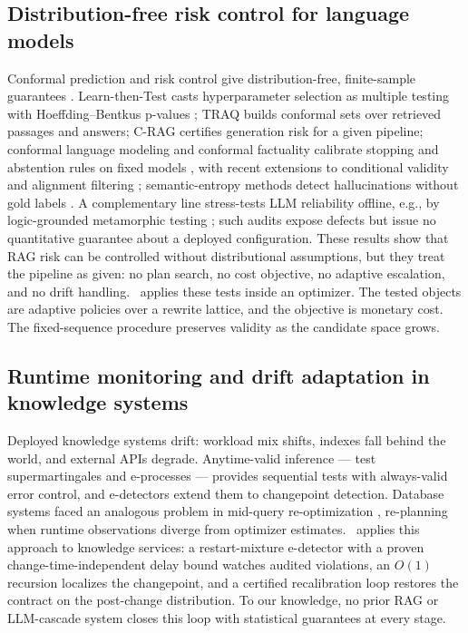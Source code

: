 \subsection{Distribution-free risk control for language models}
Conformal prediction and risk control give distribution-free,
finite-sample guarantees
\citep{vovk2005algorithmic,angelopoulos2024crc}.
Learn-then-Test \citep{angelopoulos2021ltt} casts hyperparameter
selection as multiple testing with Hoeffding--Bentkus p-values
\citep{bentkus2004hoeffding}; TRAQ \citep{li2024traq} builds conformal
sets over retrieved passages and answers; C-RAG \citep{kang2024crag}
certifies generation risk for a given pipeline; conformal language
modeling and conformal factuality calibrate stopping and abstention
rules on fixed models
\citep{quach2024conformallm,mohri2024factuality}, with recent
extensions to conditional validity and alignment filtering
\citep{cherian2024validity,gui2024conformalalign}; semantic-entropy
methods detect hallucinations without gold labels
\citep{farquhar2024semantic}. A complementary line stress-tests LLM
reliability offline, e.g., by logic-grounded metamorphic testing
\citep{zhou2026lgmt}; such audits expose defects but issue no
quantitative guarantee about a deployed configuration. These results
show that RAG risk can be controlled without distributional assumptions,
but they
treat the pipeline as given: no plan search, no cost objective, no
adaptive escalation, and no drift handling. \system\ applies these tests
inside an optimizer. The tested objects are adaptive policies over a
rewrite lattice, and the objective is monetary cost. The fixed-sequence
procedure preserves validity as the candidate space grows.

\subsection{Runtime monitoring and drift adaptation in knowledge systems}
Deployed knowledge systems drift: workload mix shifts, indexes fall
behind the world, and external APIs degrade. Anytime-valid inference
--- test supermartingales and e-processes
\citep{ville1939etude,shafer2021testing,ramdas2023savi,
waudbysmith2024betting,grunwald2024safe}
--- provides
sequential tests with always-valid error control, and e-detectors
\citep{shin2024edetectors} extend them to changepoint detection.
Database systems faced an analogous problem in mid-query
re-optimization \citep{kabra1998efficient,markl2004robust,deng2007spc}, re-planning
when runtime observations diverge from optimizer estimates. \system\
applies this approach to knowledge services: a restart-mixture
e-detector with a proven change-time-independent delay bound watches
audited violations, an $O(1)$ recursion localizes the changepoint, and
a certified recalibration loop restores the contract on the post-change
distribution. To our knowledge, no prior RAG or LLM-cascade system
closes this loop with statistical guarantees at every stage.
